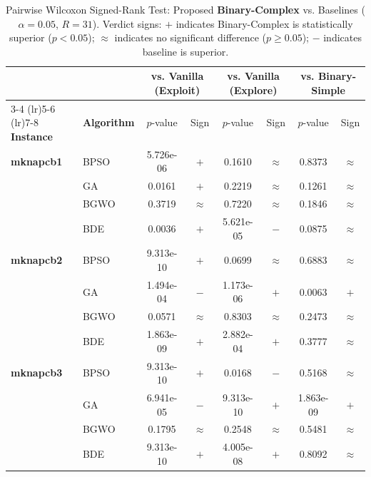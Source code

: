 \documentclass[journal,article,submit,moreauthors]{Definitions/mdpi}
\begin{document}
\begin{table}[htbp]
  \centering
  \small
  \caption{Pairwise Wilcoxon Signed-Rank Test: Proposed \textbf{Binary-Complex} vs. Baselines ($\alpha=0.05$, $R=31$). Verdict signs: $+$ indicates Binary-Complex is statistically superior ($p < 0.05$); $\approx$ indicates no significant difference ($p \ge 0.05$); $-$ indicates baseline is superior.}
  \label{tab:wilcoxon_tests}
  \begin{tabular*}{\textwidth}{@{\extracolsep{\fill}}llcccccc@{}}
    \toprule
    & & \multicolumn{2}{c}{\textbf{vs. Vanilla (Exploit)}} & \multicolumn{2}{c}{\textbf{vs. Vanilla (Explore)}} & \multicolumn{2}{c}{\textbf{vs. Binary-Simple}} \\
    \cmidrule(lr){3-4} \cmidrule(lr){5-6} \cmidrule(lr){7-8}
    \textbf{Instance} & \textbf{Algorithm} & $p$-value & Sign & $p$-value & Sign & $p$-value & Sign \\
    \midrule
    \textbf{mknapcb1}  & BPSO  & 5.726e-06 & $+$ & 0.1610 & $\approx$ & 0.8373 & $\approx$ \\
                       & GA    & 0.0161 & $+$ & 0.2219 & $\approx$ & 0.1261 & $\approx$ \\
                       & BGWO  & 0.3719 & $\approx$ & 0.7220 & $\approx$ & 0.1846 & $\approx$ \\
                       & BDE   & 0.0036 & $+$ & 5.621e-05 & $-$ & 0.0875 & $\approx$ \\
    \midrule
    \textbf{mknapcb2}  & BPSO  & 9.313e-10 & $+$ & 0.0699 & $\approx$ & 0.6883 & $\approx$ \\
                       & GA    & 1.494e-04 & $-$ & 1.173e-06 & $+$ & 0.0063 & $+$ \\
                       & BGWO  & 0.0571 & $\approx$ & 0.8303 & $\approx$ & 0.2473 & $\approx$ \\
                       & BDE   & 1.863e-09 & $+$ & 2.882e-04 & $+$ & 0.3777 & $\approx$ \\
    \midrule
    \textbf{mknapcb3}  & BPSO  & 9.313e-10 & $+$ & 0.0168 & $-$ & 0.5168 & $\approx$ \\
                       & GA    & 6.941e-05 & $-$ & 9.313e-10 & $+$ & 1.863e-09 & $+$ \\
                       & BGWO  & 0.1795 & $\approx$ & 0.2548 & $\approx$ & 0.5481 & $\approx$ \\
                       & BDE   & 9.313e-10 & $+$ & 4.005e-08 & $+$ & 0.8092 & $\approx$ \\

\end{tabular*}
\end{table}
\end{document}
